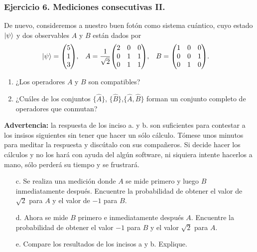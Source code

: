 \documentclass[11pt,letterpaper]{article}
\begin{document}
\subsubsection*{Ejercicio 6. Mediciones consecutivas II.}
De nuevo, consideremos a nuestro buen fotón como sistema cuántico,
cuyo estado $\ket{\psi}$ y dos observables $A$ y $B$ están dados por 
\begin{align}
\ket{\psi}&=\mqty(5\\1\\3),&
A&=\frac{1}{\sqrt{2}}\mqty(2&0&0\\0&1&1\\0&1&1),&
B&=\mqty(1&0&0\\0&0&1\\0&1&0).
\end{align}
\begin{enumerate}
\item ¿Los operadores $A$ y $B$ son compatibles? 
\item ¿Cuáles de los conjuntos $\{ \hat A\}$, $\{ \hat B\}$,$\{ \hat A,\hat B\}$ 
forman un conjunto completo de operadores que conmutan?
\end{enumerate}
\textbf{Advertencia:} la respuesta de los inciso a. y b. son suficientes
para contestar a los insisos siguientes sin tener que hacer un sólo 
cálculo. Tómese unos minutos para meditar la respuesta y discútalo con
sus compañeros. Si decide hacer los cálculos y no los hará con ayuda del algún 
software, ni siquiera intente hacerlos a mano, sólo perderá su tiempo y se frustrará.
\begin{enumerate}
\item[c.] Se realiza una medición donde $A$ se mide primero y luego $B$ 
inmediatamente 
después. Encuentre la probabilidad de obtener el valor de $\sqrt{2}$ para $A$
y el valor de $-1$ para $B$.
\item[d.] Ahora se mide $B$ primero e inmediatamente después $A$. Encuentre 
la probabilidad de obtener el valor $-1$ para $B$ y el valor $\sqrt{2}$ para $A$.
\item[e.] Compare los resultados de los incisos a y b. Explique.
\end{enumerate}
\end{document}
